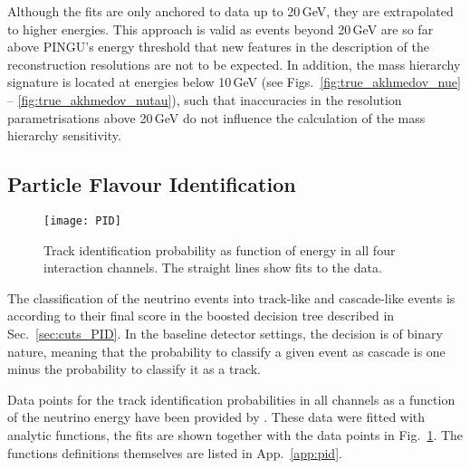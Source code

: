 Although the fits are only anchored to data up to 20\,GeV, they are extrapolated
to higher energies. This approach is valid as events beyond 20\,GeV are so far
above PINGU's energy threshold that new features in the description of the
reconstruction resolutions are not to be expected. In addition, the mass
hierarchy signature is located at energies below 10\,GeV (see
Figs.~\ref{fig:true_akhmedov_nue} -- \ref{fig:true_akhmedov_nutau}), such that
inaccuracies in the resolution parametrisations above 20\,GeV do not influence
the calculation of the mass hierarchy sensitivity.

\subsection{Particle Flavour Identification}
\label{sec:input_pid}

\begin{figure}[htbp]
 \centering
 \texttt{[image: PID]}
 \caption{Track identification probability as function of energy in all four
  interaction channels. The straight lines show fits to the data.}
 \label{fig:PID}
\end{figure}

The classification of the neutrino events into track-like and cascade-like
events is according to their final score in the boosted decision tree described
in Sec.~\ref{sec:cuts_PID}. In the baseline detector settings, the decision is
of binary nature, meaning that the probability to classify a given event as
cascade is one minus the probability to classify it as a track.

Data points for the track identification probabilities in all channels as a
function of the neutrino energy have been provided by \cite{JP_PID}. These data
were fitted with analytic functions, the fits are shown together with the data
points in Fig.~\ref{fig:PID}. The functions definitions themselves are listed
in App.~\ref{app:pid}.